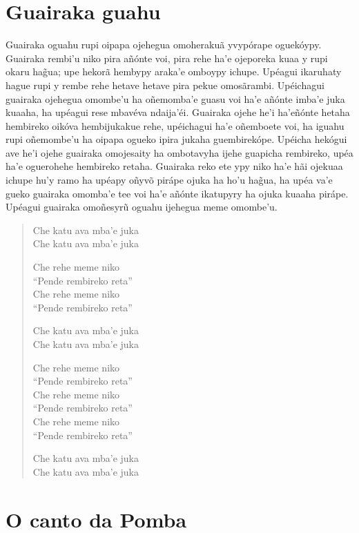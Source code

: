 \chapter{Guairaka guahu}

Guairaka oguahu rupi oipapa ojehegua omoherakuã yvypórape oguekóypy.
Guairaka rembi'u niko pira añónte voi, pira rehe ha'e ojeporeka kuaa y
rupi okaru hag̃ua; upe hekorã hembypy araka'e omboypy ichupe. Upéagui
ikaruhaty hague rupi y rembe rehe hetave hetave pira pekue omosãrambi.
Upéichagui guairaka ojehegua omombe'u ha oñemomba'e guasu voi ha'e
añónte imba'e juka kuaaha, ha upéagui rese mbavéva ndaija'éi. Guairaka
ojehe he'i ha'eñónte hetaha hembireko oikóva hembijukakue rehe,
upéichagui ha'e oñemboete voi, ha iguahu rupi oñemombe'u ha oipapa
ogueko ipira jukaha guembirekópe. Upéicha hekógui ave he'i ojehe
guairaka omojesaity ha ombotavyha ijehe guapicha rembireko, upéa ha'e
oguerohehe hembireko retaha. Guairaka reko ete ypy niko ha'e hãi ojekuaa
ichupe hu'y ramo ha upéapy oñyvõ pirápe ojuka ha ho'u hag̃ua, ha upéa
va'e gueko guairaka omomba'e tee voi ha'e añónte ikatupyry ha ojuka
kuaaha pirápe. Upéagui guairaka omoñesyrũ oguahu ijehegua meme omombe'u.

\begin{verse}
Che katu ava mba'e juka\\
Che katu ava mba'e juka
       
Che rehe meme niko\\
``Pende rembireko reta''\\
Che rehe meme niko\\
``Pende rembireko reta''
       
Che katu ava mba'e juka\\
Che katu ava mba'e juka          
       
Che rehe meme niko\\
``Pende rembireko reta''\\
Che rehe meme niko\\
``Pende rembireko reta''\\
Che rehe meme niko\\
``Pende rembireko reta''
       
Che katu ava mba'e juka\\
Che katu ava mba'e juka
\end{verse}

\chapter{O canto da Pomba}

